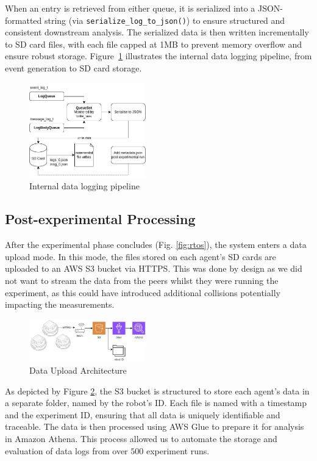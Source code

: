 \documentclass[conference]{IEEEtran}
\begin{document}
When an entry is retrieved from either queue, it is serialized into a JSON-formatted string (via \texttt{serialize\_log\_to\_json()}) to ensure structured and consistent downstream analysis. The serialized data is then written incrementally to SD card files, with each file capped at 1MB to prevent memory overflow and ensure robust storage. Figure~\ref{fig:data-store} illustrates the internal data logging pipeline, from event generation to SD card storage.

\begin{figure}[h]
    \centering
    \includegraphics[width=0.45\textwidth]{data_store.png}
    \caption{Internal data logging pipeline}
    \label{fig:data-store}
\end{figure}

\subsection{Post-experimental Processing}

After the experimental phase concludes (Fig. \ref{fig:rtos}), the system enters a data upload mode. In this mode, the files stored on each agent's SD cards are uploaded to an AWS S3 bucket via HTTPS. This was done by design as we did not want to stream the data from the peers whilst they were running the experiment, as this could have introduced additional collisions potentially impacting the measurements.\\

\begin{figure}[H]
    \centering
    \includegraphics[width=0.45\textwidth]{athena.png}
    \caption{Data Upload Architecture}
    \label{fig:athena}
\end{figure}

As depicted by Figure \ref{fig:athena}, the S3 bucket is structured to store each agent's data in a separate folder, named by the robot's ID. Each file is named with a timestamp and the experiment ID, ensuring that all data is uniquely identifiable and traceable. The data is then processed using AWS Glue to prepare it for analysis in Amazon Athena. This process allowed us to automate the storage and evaluation of data logs from over $500$ experiment runs.
\end{document}

